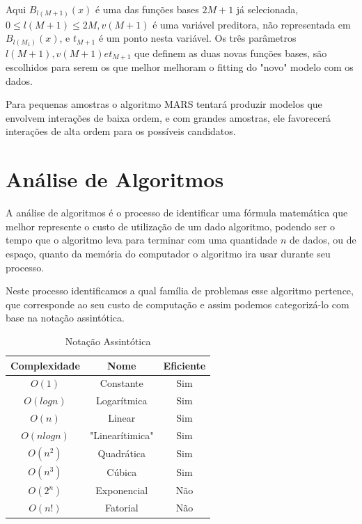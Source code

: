 \documentclass[
    12pt,               %
    openright,          %
    oneside,            %
    a4paper,            %
    english,            %
    brazil              %
    ]{abntex2}
\begin{document}
Aqui $B_{l(M+1)}(x)$ é uma das funções bases $2M + 1$ já selecionada, $0 \leq l(M+1) \leq 2M, v(M+1)$ é uma variável preditora, não
representada em $B_{l(M_1)}(x)$, e $t_{M+1}$ é um ponto nesta variável. Os três parâmetros $l(M+1), v(M+1) e t_{M+1}$ que definem as
duas novas funções bases, são escolhidos para serem os que melhor melhoram o fitting do "novo" modelo com os dados.

Para pequenas amostras o algoritmo MARS tentará produzir modelos que envolvem interações de baixa ordem, e com grandes amostras, 
ele favorecerá interações de alta ordem para os possíveis candidatos.

\section{Análise de Algoritmos}

A análise de algoritmos é o processo de identificar uma fórmula matemática que melhor represente o custo de
utilização de um dado algoritmo, podendo ser o tempo que o algoritmo leva para terminar com uma quantidade $n$
de dados, ou de espaço, quanto da memória do computador o algoritmo ira usar durante seu processo.

Neste processo identificamos a qual família de problemas esse algoritmo pertence, que corresponde ao seu custo de
computação \cite{introductionAlgorthms} e assim podemos categorizá-lo com base na notação assintótica.

\begin{table}[H]
    \centering
    \caption{\label{Notação Assintótica}Notação Assintótica}
    \begin{tabular}{|c|c|c|}
    \hline
        Complexidade & Nome & Eficiente \\ \hline
        $O(1)$ & Constante & Sim \\ \hline
        $O(log n)$ & Logarítmica & Sim \\ \hline
        $O(n)$ & Linear & Sim \\ \hline
        $O(n log n)$ & "Linearítimica" & Sim \\ \hline
        $O(n^2)$ & Quadrática & Sim \\ \hline
        $O(n^3)$ & Cúbica & Sim \\ \hline
        $O(2^n)$ & Exponencial & Não \\ \hline
        $O(n!)$ & Fatorial & Não \\ \hline
    \end{tabular}
\end{table}
\end{document}
